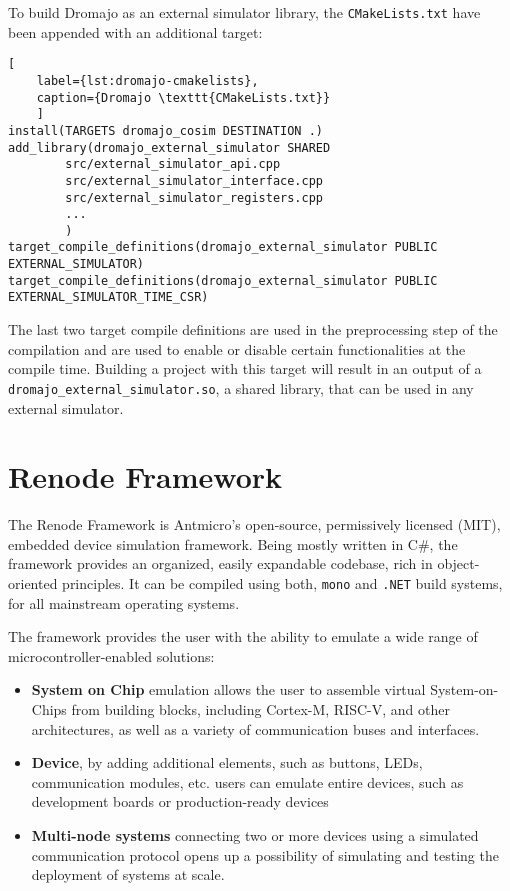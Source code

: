 To build Dromajo as an external simulator library, the \texttt{CMakeLists.txt} have been appended with an additional
target:

\begin{lstlisting}[
    label={lst:dromajo-cmakelists},
    caption={Dromajo \texttt{CMakeLists.txt}}
    ]
install(TARGETS dromajo_cosim DESTINATION .)
add_library(dromajo_external_simulator SHARED
        src/external_simulator_api.cpp
        src/external_simulator_interface.cpp
        src/external_simulator_registers.cpp
        ...
        )
target_compile_definitions(dromajo_external_simulator PUBLIC EXTERNAL_SIMULATOR)
target_compile_definitions(dromajo_external_simulator PUBLIC EXTERNAL_SIMULATOR_TIME_CSR)
\end{lstlisting}

\noindent
The last two target compile definitions are used in the preprocessing step of the compilation and are used to enable
or disable certain functionalities at the compile time. Building a project with this target will result in an output
of a \texttt{dromajo\_external\_simulator.so}, a shared library, that can be used in any external simulator.

\pagebreak

\section{Renode Framework}
The Renode Framework is Antmicro's open-source, permissively licensed (MIT), embedded device simulation framework.
Being mostly written in C\#, the framework provides an organized, easily expandable codebase, rich in
object-oriented principles. It can be compiled using both, \texttt{mono} and \texttt{.NET} build systems, for
all mainstream operating systems.

The framework provides the user with the ability to emulate a wide range of microcontroller-enabled solutions:
\begin{itemize}
    \item{\textbf{System on Chip} emulation allows the user to assemble virtual System-on-Chips from building blocks,
    including Cortex-M, RISC-V, and other architectures, as well as a variety of communication buses and interfaces.}
    \item{\textbf{Device}, by adding additional elements, such as buttons, LEDs, communication modules, etc. users can
    emulate entire devices, such as development boards or production-ready devices}
    \item{\textbf{Multi-node systems} connecting two or more devices using a simulated communication protocol opens
    up a possibility of simulating and testing the deployment of systems at scale.}
\end{itemize}

